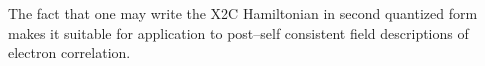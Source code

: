 The fact that one may write the X2C Hamiltonian in second quantized form makes it
suitable for application to post--self consistent field descriptions of
electron correlation. 


